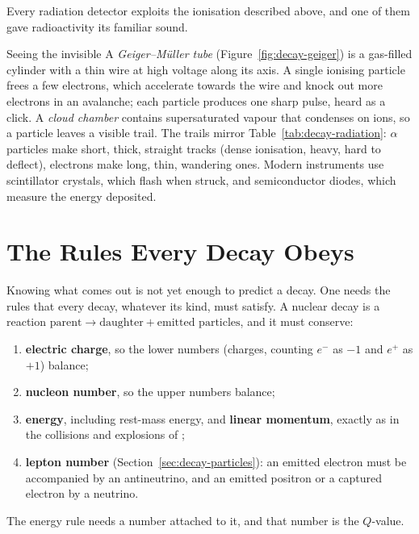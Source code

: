 Every radiation detector exploits the ionisation described above, and one of them gave radioactivity its
familiar sound.

\begin{remarkbox}{Seeing the invisible}
A \emph{Geiger--M\"uller tube} (Figure~\ref{fig:decay-geiger}) is a gas-filled cylinder with a thin wire
at high voltage along its axis. A single ionising particle frees a few electrons, which accelerate towards
the wire and knock out more electrons in an avalanche; each particle produces one sharp pulse, heard as a
click. A \emph{cloud chamber} contains supersaturated vapour that condenses on ions, so a particle leaves
a visible trail. The trails mirror Table~\ref{tab:decay-radiation}: $\alpha$ particles make short, thick,
straight tracks (dense ionisation, heavy, hard to deflect), electrons make long, thin, wandering ones.
Modern instruments use scintillator crystals, which flash when struck, and semiconductor diodes, which
measure the energy deposited.
\end{remarkbox}

\begin{figure}[htbp]
\centering
{}
\end{figure}

\section{The Rules Every Decay Obeys}\label{sec:decay-rules}

Knowing what comes out is not yet enough to predict a decay. One needs the rules that every decay,
whatever its kind, must satisfy. A nuclear decay is a reaction
$\text{parent}\to\text{daughter}+\text{emitted particles}$, and it must conserve:
\begin{enumerate}[label=\textbf{\arabic*.}]
\item \textbf{electric charge}, so the lower numbers (charges, counting $e^-$ as $-1$ and $e^+$ as $+1$)
      balance;
\item \textbf{nucleon number}, so the upper numbers balance;
\item \textbf{energy}, including rest-mass energy, and \textbf{linear momentum}, exactly as in the
      collisions and explosions of ;
\item \textbf{lepton number} (Section~\ref{sec:decay-particles}): an emitted electron must be accompanied
      by an antineutrino, and an emitted positron or a captured electron by a neutrino.
\end{enumerate}
The energy rule needs a number attached to it, and that number is the $Q$-value.

